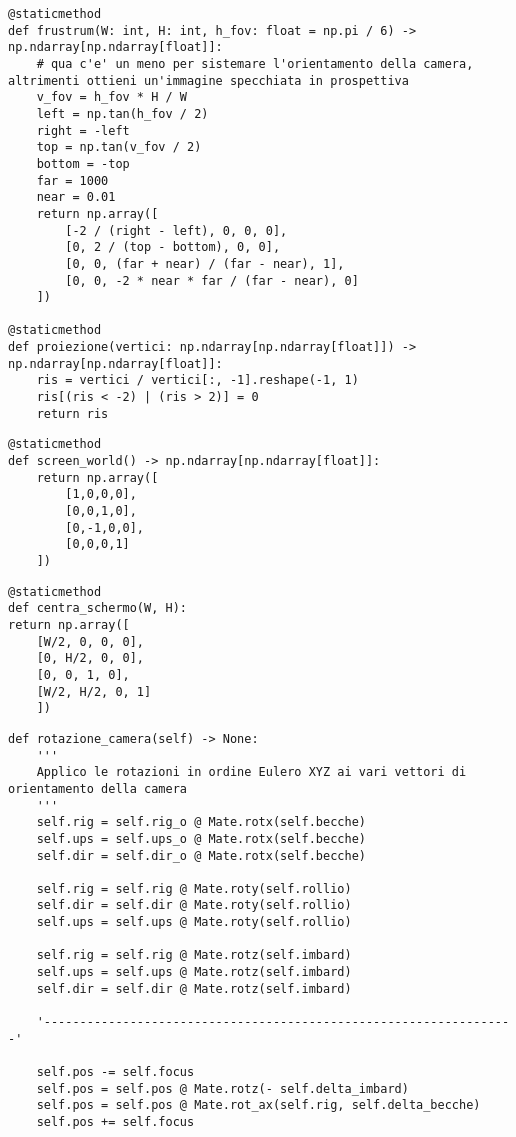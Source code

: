 \documentclass{article}
\begin{document}
\begin{lstlisting}[style=Pythonstyle, caption={Matrici di applicazione prospettiva}]
@staticmethod
def frustrum(W: int, H: int, h_fov: float = np.pi / 6) -> np.ndarray[np.ndarray[float]]:
	# qua c'e' un meno per sistemare l'orientamento della camera, altrimenti ottieni un'immagine specchiata in prospettiva
	v_fov = h_fov * H / W
	left = np.tan(h_fov / 2)
	right = -left
	top = np.tan(v_fov / 2)
	bottom = -top
	far = 1000
	near = 0.01
	return np.array([
		[-2 / (right - left), 0, 0, 0],
		[0, 2 / (top - bottom), 0, 0],
		[0, 0, (far + near) / (far - near), 1],
		[0, 0, -2 * near * far / (far - near), 0]
	])

@staticmethod
def proiezione(vertici: np.ndarray[np.ndarray[float]]) -> np.ndarray[np.ndarray[float]]:
	ris = vertici / vertici[:, -1].reshape(-1, 1)
	ris[(ris < -2) | (ris > 2)] = 0
	return ris
\end{lstlisting}

\newpage

\begin{lstlisting}[style=Pythonstyle, caption={Matrice di cambio sistema di riferimento (schermo)}]
@staticmethod
def screen_world() -> np.ndarray[np.ndarray[float]]:
	return np.array([
		[1,0,0,0],
		[0,0,1,0],
		[0,-1,0,0],
		[0,0,0,1]
	])
\end{lstlisting}

\begin{lstlisting}[style=Pythonstyle, caption={Matrice di adattamento spazio normalizzato a dimensione dello schermo in px}]
@staticmethod
def centra_schermo(W, H):
return np.array([
	[W/2, 0, 0, 0],
	[0, H/2, 0, 0],
	[0, 0, 1, 0],
	[W/2, H/2, 0, 1]
	])
\end{lstlisting}
	
\begin{lstlisting}[style=Pythonstyle, caption={prima e seconda parte dell'aggiornamento degli attributi della camera}]
def rotazione_camera(self) -> None:
	'''
	Applico le rotazioni in ordine Eulero XYZ ai vari vettori di orientamento della camera
	'''
	self.rig = self.rig_o @ Mate.rotx(self.becche)
	self.ups = self.ups_o @ Mate.rotx(self.becche)
	self.dir = self.dir_o @ Mate.rotx(self.becche)

	self.rig = self.rig @ Mate.roty(self.rollio)
	self.dir = self.dir @ Mate.roty(self.rollio)
	self.ups = self.ups @ Mate.roty(self.rollio)

	self.rig = self.rig @ Mate.rotz(self.imbard)
	self.ups = self.ups @ Mate.rotz(self.imbard)
	self.dir = self.dir @ Mate.rotz(self.imbard)

	'------------------------------------------------------------------'

	self.pos -= self.focus
	self.pos = self.pos @ Mate.rotz(- self.delta_imbard)
	self.pos = self.pos @ Mate.rot_ax(self.rig, self.delta_becche)
	self.pos += self.focus
\end{lstlisting}
\end{document}
